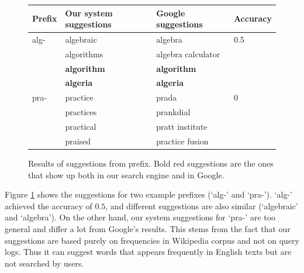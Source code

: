 \documentclass{article}
\begin{document}
\begin{figure}[!h]
\begin{center}
\begin{tabular}{| l | l | l | l |}
\hline
Prefix & Our system suggestions & Google suggestions & Accuracy \\
\hline
alg- & algebraic & algebra & 0.5 \\
& algorithms & algebra calculator & \\
& {\bf \color{red} algorithm} & {\bf \color{red} algorithm} & \\
& {\bf \color{red} algeria} & {\bf \color{red} algeria} & \\
\hline
pra- & practice & prada & 0\\
& practices & prankdial & \\
& practical & pratt institute & \\
& praised & practice fusion & \\
\hline
\end{tabular}
\end{center}
\caption{Results of suggestions from prefix. Bold red suggestions are the ones that show up both in our search engine and in Google.}
\label{fig:word}
\end{figure}

Figure \ref{fig:word} shows the suggestions for two example prefixes (`alg-' and `pra-'). `alg-' achieved the accuracy of $0.5$, and different suggestions are also similar (`algebraic' and `algebra'). On the other hand, our system suggestions for `pra-' are too general and differ a lot from Google's results. This stems from the fact that our suggestions are based purely on frequencies in Wikipedia corpus and not on query logs. Thus it can suggest words that appears frequently in English texts but are not searched by users.
\end{document}
